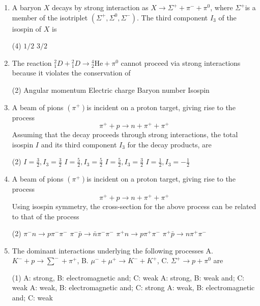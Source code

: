 \begin{enumerate}
\begin{tasks}
	\end{tasks}
	\item  A baryon $X$ decays by strong interaction as $X \rightarrow \Sigma^{+}+\pi^{-}+\pi^0$, where $\Sigma^{+}$is a member of the isotriplet $\left(\Sigma^{+}, \Sigma^0, \Sigma^{-}\right)$. The third component $I_3$ of the isospin of $X$ is
	{}
	 \begin{tasks}(4)
		\task[\textbf{b.}] $1 / 2$
		\task[\textbf{d.}] $3 / 2$
	\end{tasks}
	\item  The reaction ${ }_1^2 D+{ }_1^2 D \rightarrow{ }_2^4 \mathrm{He}+\pi^0$ cannot proceed via strong interactions because it violates the conservation of
	{}
	 \begin{tasks}(2)
		\task[\textbf{a.}]Angular momentum
		\task[\textbf{b.}]Electric charge
		\task[\textbf{c.}]Baryon number
		\task[\textbf{d.}] Isospin 
	\end{tasks}

	\item  A beam of pions $\left(\pi^{+}\right)$is incident on a proton target, giving rise to the process
	$$
	\pi^{+}+p \rightarrow n+\pi^{+}+\pi^{+}
	$$
	Assuming that the decay proceeds through strong interactions, the total isospin $I$ and its third component $I_3$ for the decay products, are
	{}
	 \begin{tasks}(2)
		\task[\textbf{a.}] $I=\frac{3}{2}, I_3=\frac{3}{2}$
		\task[\textbf{b.}]$I=\frac{5}{2}, I_3=\frac{5}{2}$
		\task[\textbf{c.}]$I=\frac{5}{2}, I_3=\frac{3}{2}$
		\task[\textbf{d.}] $I=\frac{1}{2}, I_3=-\frac{1}{2}$
	\end{tasks}
	\item  A beam of pions $\left(\pi^{+}\right)$is incident on a proton target, giving rise to the process
	$$
	\pi^{+}+p \rightarrow n+\pi^{+}+\pi^{+}
	$$
	Using isospin symmetry, the cross-section for the above process can be related to that of the process
	 \begin{tasks}(2)
		\task[\textbf{a.}]$\pi^{-} n \rightarrow p \pi^{-} \pi^{-}$
		\task[\textbf{b.}]$\pi^{-} \bar{p} \rightarrow \bar{n} \pi^{-} \pi^{-}$
		\task[\textbf{c.}]$\pi^{+} n \rightarrow p \pi^{+} \pi^{-}$
		\task[\textbf{d.}]  $\pi^{+} \bar{p} \rightarrow n \pi^{+} \pi^{-}$
	\end{tasks}

	\item  The dominant interactions underlying the following processes
	A. $K^{-}+p \rightarrow \sum^{-}+\pi^{+}$, B. $\mu^{-}+\mu^{+} \rightarrow K^{-}+K^{+}$, C. $\Sigma^{+} \rightarrow p+\pi^0$ are
	{}
	 \begin{tasks}(1)
		\task[\textbf{a.}]A: strong, B: electromagnetic and; C: weak
		\task[\textbf{b.}]A: strong, B: weak and; C: weak
		\task[\textbf{c.}]A: weak, B: electromagnetic and; C: strong
		\task[\textbf{d.}]  A: weak, B: electromagnetic and; C: weak
	\end{tasks}
	

\end{enumerate}
